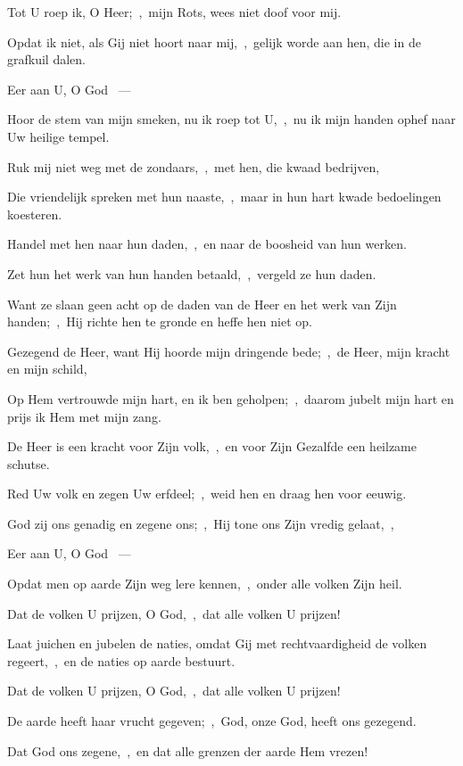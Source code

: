 \documentclass[12pt,twoside,a5paper]{article}
\begin{document}
\begin{halfparskip}
   

  Tot U roep ik, O Heer;~\sep\ mijn Rots, wees niet doof voor mij.

  Opdat ik niet, als Gij niet hoort naar mij,~\sep\ gelijk worde aan hen, die in de grafkuil dalen.

  Eer aan U, O God ~---  

  Hoor de stem van mijn smeken, nu ik roep tot U,~\sep\ nu ik mijn handen ophef naar Uw heilige tempel.

  Ruk mij niet weg met de zondaars,~\sep\ met hen, die kwaad bedrijven,

  Die vriendelijk spreken met hun naaste,~\sep\ maar in hun hart kwade bedoelingen koesteren.

  Handel met hen naar hun daden,~\sep\ en naar de boosheid van hun werken.

  Zet hun het werk van hun handen betaald,~\sep\ vergeld ze hun daden.

  Want ze slaan geen acht op de daden van de Heer en het werk van Zijn handen;~\sep\ Hij richte hen te gronde en heffe hen niet op.

  Gezegend de Heer, want Hij hoorde mijn dringende bede;~\sep\ de Heer, mijn kracht en mijn schild,

  Op Hem vertrouwde mijn hart, en ik ben geholpen;~\sep\ daarom jubelt mijn hart en prijs ik Hem met mijn zang.

  De Heer is een kracht voor Zijn volk,~\sep\ en voor Zijn Gezalfde een heilzame schutse.

  Red Uw volk en zegen Uw erfdeel;~\sep\ weid hen en draag hen voor eeuwig.
\end{halfparskip}

\begin{halfparskip}
   

  God zij ons genadig en zegene ons;~\sep\ Hij tone ons Zijn vredig gelaat,~\sep

  Eer aan U, O God ~---  

  Opdat men op aarde Zijn weg lere kennen,~\sep\ onder alle volken Zijn heil.

  Dat de volken U prijzen, O God,~\sep\ dat alle volken U prijzen!

  Laat juichen en jubelen de naties, omdat Gij met rechtvaardigheid de volken regeert,~\sep\ en de naties op aarde bestuurt.

  Dat de volken U prijzen, O God,~\sep\ dat alle volken U prijzen!

  De aarde heeft haar vrucht gegeven;~\sep\ God, onze God, heeft ons gezegend.

  Dat God ons zegene,~\sep\ en dat alle grenzen der aarde Hem vrezen!
\end{halfparskip}
\end{document}
